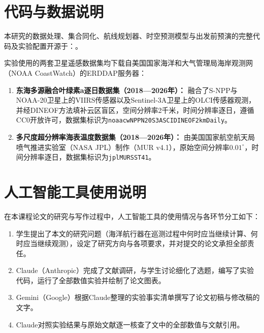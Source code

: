 \section{代码与数据说明}

本研究的数据处理、集合同化、航线规划器、时空预测模型与出发前预演的完整代码及实验配置开源于：。

实验使用的两套卫星遥感数据集均下载自美国国家海洋和大气管理局海岸观测网（NOAA CoastWatch）的ERDDAP服务器：
\begin{enumerate}
  \item \textbf{东海多源融合叶绿素a逐日数据集（2018—2026年）：} 融合了S-NPP与NOAA-20卫星上的VIIRS传感器以及Sentinel-3A卫星上的OLCI传感器观测，并经DINEOF方法填补云区盲区，空间分辨率2千米，时间分辨率逐日，遵循CC0开放许可，数据集标识为\texttt{noaacwNPPN20S3ASCIDINEOF2kmDaily}。
  \item \textbf{多尺度超分辨率海表温度数据集（2018—2026年）：} 由美国国家航空航天局喷气推进实验室（NASA JPL）制作（MUR v4.1），原始空间分辨率$0.01^\circ$，时间分辨率逐日，数据集标识为\texttt{jplMURSST41}。
\end{enumerate}

\section{人工智能工具使用说明}

在本课程论文的研究与写作过程中，人工智能工具的使用情况与各环节分工如下：
\begin{enumerate}
  \item 学生提出了本文的研究问题（海洋航行器在巡测过程中何时应当继续计算、何时应当继续观测），设定了研究方向与各项要求，并对提交的论文承担全部责任。
  \item Claude（Anthropic）完成了文献调研，与学生讨论细化了选题，编写了实验代码，运行了全部数值实验并绘制了论文图表。
  \item Gemini（Google）根据Claude整理的实验事实清单撰写了论文初稿与修改稿的文字。
  \item Claude对照实验结果与原始文献逐一核查了文中的全部数值与文献引用。
\end{enumerate}
